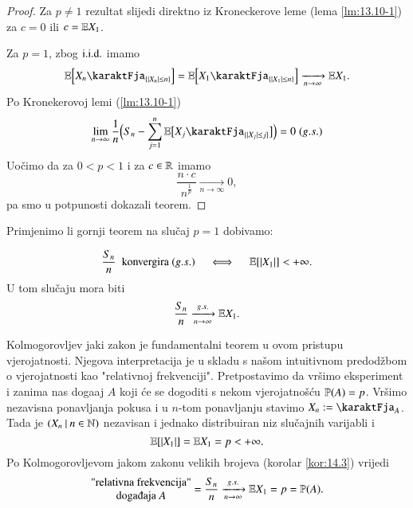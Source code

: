 \begin{proof}
    Za $p \neq 1$ rezultat slijedi direktno iz Kroneckerove leme (lema \ref{lm:13.10-1}) za $c = 0$ ili $c = \mathbb{E} X_1$.

    Za $p = 1$, zbog $\mathrm{i.i.d.}$ imamo
    \begin{equation*}
        \masE \Big[ X_n \karaktFja_{\{ |X_n| \leq n \}} \Big] = \masE \Big[ X_1 \karaktFja_{\{ |X_1| \leq n \}} \Big] \xrightarrow[n \to \infty]{} \masE X_1. 
    \end{equation*}
    Po Kronekerovoj lemi (\ref{lm:13.10-1})
    \begin{equation*}
        \lim\limits_{n \to \infty} \frac{1}{n} \Big( S_n - \suma{j = 1}{n} \masE \big[ X_j \karaktFja_{\{ |X_j| \leq j \}} \big] \Big) = 0 \; (g.s.)
    \end{equation*}
    Uo\v cimo da za $0 < p < 1$ i za $c \in \mathbb{R}$ imamo
    \begin{equation*}
        \frac{n \cdot c}{n^\frac{1}{p}} \xrightarrow[n \to \infty]{} 0,
    \end{equation*}
    pa smo u potpunosti dokazali teorem.
\end{proof}

Primjenimo li gornji teorem na slu\v caj $p = 1$ dobivamo:

\begin{kor} \label{kor:14.3}
    \begin{equation*}
        \frac{S_n}{n} \; \textnormal{ konvergira } (g.s.) \quad \iff \quad \mathbb{E} [|X_1|] < + \infty.
    \end{equation*}
    U tom slu\v caju mora biti
    \begin{equation*}
        \frac{S_n}{n} \xrightarrow[n \to \infty]{g.s.} \mathbb{E} X_1.
    \end{equation*}
\end{kor}

\begin{nap} \label{nap:14.4}
    Kolmogorovljev jaki zakon je fundamentalni teorem u ovom pristupu vjerojatnosti.
    Njegova interpretacija je u skladu s na\v som intuitivnom predod\v zbom o vjerojatnosti kao "relativnoj frekvenciji".
    Pretpostavimo da vr\v simo eksperiment i zanima nas doga\dj aj $A$ koji \' ce se dogoditi s nekom vjerojatno\v s\' cu $\mathbb{P}({A}) = p$.
    Vr\v simo nezavisna ponavljanja pokusa i u $n$-tom ponavljanju stavimo $X_n := \karaktFja_A$.
    Tada je $({X_n} \: | \: {n \in \mathbb{N}})$ nezavisan i jednako distribuiran niz slu\v cajnih varijabli i
    \begin{equation*}
        \mathbb{E} [|X_1|] = \mathbb{E} X_1 = p < + \infty.
    \end{equation*}
    Po Kolmogorovljevom jakom zakonu velikih brojeva (korolar \ref{kor:14.3}) vrijedi
    \begin{equation*}
        \begin{matrix}
            \textnormal{"relativna frekvencija"}\\
            \textnormal{doga\dj aja } A
        \end{matrix}
        = \frac{S_n}{n} \xrightarrow[n \to \infty]{g.s.} \masE X_1 = p = \vjeroj{A}.
    \end{equation*}
\end{nap}

